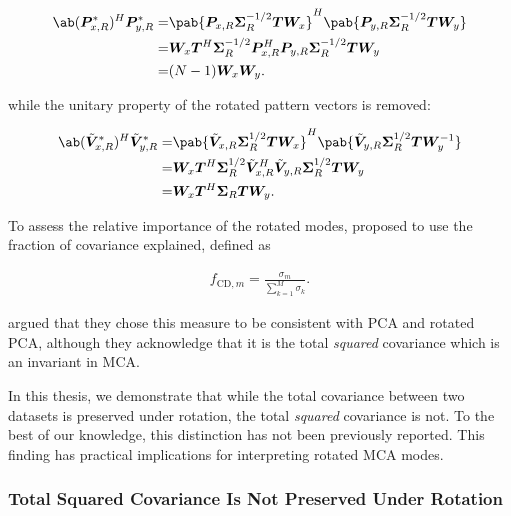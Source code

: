 \begin{align}\label{eq:theory:mca_covariance_rotated_expansion_coefficients}
    \ab(\bm{P}_{x,R}^*)^H \bm{P}_{y,R}^*  =& \pab{ \bm{P}_{x,R} \bm{\Sigma}_R^{-1/2} \bm{T} \bm{W}_x}^H \pab{ \bm{P}_{y,R} \bm{\Sigma}_R^{-1/2} \bm{T} \bm{W}_y} \nonumber\\
    =& \bm{W}_x \bm{T}^H \bm{\Sigma}_R^{-1/2} \bm{P}_{x,R}^H \bm{P}_{y,R} \bm{\Sigma}_R^{-1/2} \bm{T} \bm{W}_y \nonumber\\
    =& (N-1) \bm{W}_x \bm{W}_y.
\end{align}

while the unitary property of the rotated pattern vectors is removed:

\begin{align}
    \ab(\bmn{V}_{x,R}^*)^H \bmn{V}_{y,R}^* =& \pab{ \bmn{V}_{x,R} \bm{\Sigma}_R^{1/2} \bm{T} \bm{W}_x}^H \pab{ \bmn{V}_{y,R} \bm{\Sigma}_R^{1/2} \bm{T} \bm{W}_y^{-1}} \nonumber\\
    =& \bm{W}_x \bm{T}^H \bm{\Sigma}_R^{1/2} \bmn{V}_{x,R}^H \bmn{V}_{y,R} \bm{\Sigma}_R^{1/2} \bm{T} \bm{W}_y \nonumber\\
    =& \bm{W}_x \bm{T}^H \bm{\Sigma}_R \bm{T} \bm{W}_y.
\end{align}

To assess the relative importance of the rotated modes, \citet{cheng_orthogonal_1995} proposed to use the fraction of covariance explained, defined as

\begin{align}\label{eq:theory:mca_rotated_covariance_fraction}
    f_{\text{CD}, m} = \frac{\sigma_m}{\sum_{k=1}^{M} \sigma_k}.
\end{align}

\citet{cheng_orthogonal_1995} argued that they chose this measure to be consistent with PCA and rotated PCA, although they acknowledge that it is the total \emph{squared} covariance which is an invariant in MCA. 

In this thesis, we demonstrate that while the total covariance between two datasets is preserved under rotation, the total \emph{squared} covariance is not. To the best of our knowledge, this distinction has not been previously reported. This finding has practical implications for interpreting rotated MCA modes.

\subsubsection*{Total Squared Covariance Is Not Preserved Under Rotation}

